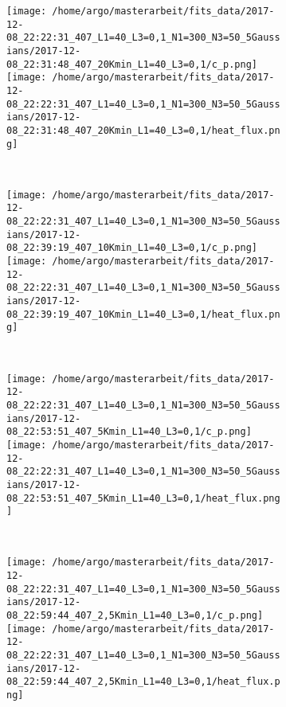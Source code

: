 \documentclass{scrartcl}[12pt, halfparskip]
\numberwithin{equation}{section}
\numberwithin{figure}{section}
\numberwithin{table}{section}
\begin{document}
\begin{figure}[H]
	\begin{subfigure}{1.\textwidth}
		\texttt{[image: /home/argo/masterarbeit/fits\_data/2017-12-08\_22:22:31\_407\_L1=40\_L3=0,1\_N1=300\_N3=50\_5Gaussians/2017-12-08\_22:31:48\_407\_20Kmin\_L1=40\_L3=0,1/c\_p.png]}
		\texttt{[image: /home/argo/masterarbeit/fits\_data/2017-12-08\_22:22:31\_407\_L1=40\_L3=0,1\_N1=300\_N3=50\_5Gaussians/2017-12-08\_22:31:48\_407\_20Kmin\_L1=40\_L3=0,1/heat\_flux.png]}
	\end{subfigure} \\[1ex]
	
	\begin{subfigure}{1.\textwidth}
		\texttt{[image: /home/argo/masterarbeit/fits\_data/2017-12-08\_22:22:31\_407\_L1=40\_L3=0,1\_N1=300\_N3=50\_5Gaussians/2017-12-08\_22:39:19\_407\_10Kmin\_L1=40\_L3=0,1/c\_p.png]}
		\texttt{[image: /home/argo/masterarbeit/fits\_data/2017-12-08\_22:22:31\_407\_L1=40\_L3=0,1\_N1=300\_N3=50\_5Gaussians/2017-12-08\_22:39:19\_407\_10Kmin\_L1=40\_L3=0,1/heat\_flux.png]}
	\end{subfigure} \\[1ex]
	
	\begin{subfigure}{1.\textwidth}
		\texttt{[image: /home/argo/masterarbeit/fits\_data/2017-12-08\_22:22:31\_407\_L1=40\_L3=0,1\_N1=300\_N3=50\_5Gaussians/2017-12-08\_22:53:51\_407\_5Kmin\_L1=40\_L3=0,1/c\_p.png]}
		\texttt{[image: /home/argo/masterarbeit/fits\_data/2017-12-08\_22:22:31\_407\_L1=40\_L3=0,1\_N1=300\_N3=50\_5Gaussians/2017-12-08\_22:53:51\_407\_5Kmin\_L1=40\_L3=0,1/heat\_flux.png]}
	\end{subfigure} \\[1ex]
	
	\begin{subfigure}{1.\textwidth}
		\texttt{[image: /home/argo/masterarbeit/fits\_data/2017-12-08\_22:22:31\_407\_L1=40\_L3=0,1\_N1=300\_N3=50\_5Gaussians/2017-12-08\_22:59:44\_407\_2,5Kmin\_L1=40\_L3=0,1/c\_p.png]}
		\texttt{[image: /home/argo/masterarbeit/fits\_data/2017-12-08\_22:22:31\_407\_L1=40\_L3=0,1\_N1=300\_N3=50\_5Gaussians/2017-12-08\_22:59:44\_407\_2,5Kmin\_L1=40\_L3=0,1/heat\_flux.png]}
	\end{subfigure} \\[1ex]
	\caption{}
	\label{fig:optim_c_p_heat_flux_5Gaussians_1}
\end{figure}
\end{document}
